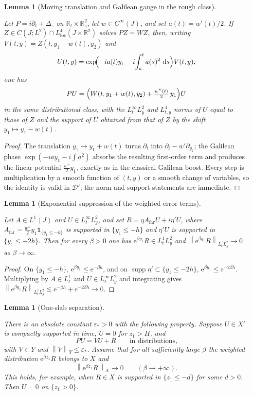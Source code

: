 \documentclass[11pt,oneside]{book}
\providecommand{\uses}[1]{}
\newtheorem{lemma}[theorem]{Lemma}
\theoremstyle{definition}
\theoremstyle{remark}
\newcommand{\R}{\mathbb R}
\newcommand{\D}{\mathcal D}
\newcommand{\supp}{\operatorname{supp}}
\newcommand{\1}{\mathbf 1}
\newcommand{\loc}{\mathrm{loc}}
\newcommand{\dd}{\,\mathrm d}
\newcommand{\norm}[1]{\left\lVert #1\right\rVert}
\newcommand{\e}{\mathrm e}
\newcommand{\eps}{\varepsilon}
\begin{document}
\begin{lemma}[Moving translation and Galilean gauge in the rough class]\label{lem:moving-galilean-distribution}
\uses{def:conjugated-operator}
Let $P=i\partial_t+\Delta_z$ on $\R_t\times\R^2_z$, let $w\in C^\infty(J)$, and set
$a(t)=w'(t)/2$. If $Z\in C(J;L^2)\cap L^4_{\loc}(J\times\R^2)$ solves $PZ=WZ$, then, writing
$V(t,y)=Z(t,y_1+w(t),y_2)$ and
\[
 U(t,y)=\exp\!\Bigl(-ia(t)y_1-i\!\int_a^t a(s)^2\,\dd s\Bigr)V(t,y),
\]
one has
\[
 PU=\Bigl(W(t,y_1+w(t),y_2)+\tfrac{w''(t)}2\,y_1\Bigr)U
\]
in the same distributional class, with the $L^\infty_tL^2_y$ and $L^4_{t,y}$ norms of $U$ equal
to those of $Z$ and the support of $U$ obtained from that of $Z$ by the shift $y_1\mapsto y_1-w(t)$.
\end{lemma}

\begin{proof}
\uses{}
The translation $y_1\mapsto y_1+w(t)$ turns $\partial_t$ into $\partial_t-w'\partial_{y_1}$; the
Galilean phase $\exp(-ia y_1-i\int a^2)$ absorbs the resulting first-order term and produces the
linear potential $\tfrac{w''}2 y_1$, exactly as in the classical Galilean boost. Every step is
multiplication by a smooth function of $(t,y)$ or a smooth change of variables, so the identity is
valid in $\D'$; the norm and support statements are immediate.
\end{proof}

\begin{lemma}[Exponential suppression of the weighted error terms]\label{lem:moment-error}
\uses{def:carleman-spaces}
Let $A\in L^1(J)$ and $U\in L^\infty_tL^2_y$, and set
$R=\eta A_{\mathrm{far}}U+i\eta'U$, where $A_{\mathrm{far}}=\tfrac{w''}2 y_1\1_{\{y_1\le-h\}}$ is
supported in $\{y_1\le-h\}$ and $\eta'U$ is supported in $\{y_1\le-2h\}$. Then for every
$\beta>0$ one has $\e^{\beta y_1}R\in L^1_tL^2_y$ and
$\norm{\e^{\beta y_1}R}_{L^1_tL^2_y}\to0$ as $\beta\to\infty$.
\end{lemma}

\begin{proof}
\uses{}
On $\{y_1\le-h\}$, $\e^{\beta y_1}\le\e^{-\beta h}$, and on $\supp\eta'\subset\{y_1\le-2h\}$,
$\e^{\beta y_1}\le\e^{-2\beta h}$. Multiplying by $A\in L^1_t$ and $U\in L^\infty_tL^2_y$ and
integrating gives $\norm{\e^{\beta y_1}R}_{L^1_tL^2_y}\lesssim\e^{-\beta h}+\e^{-2\beta h}\to0$.
\end{proof}

\begin{lemma}[One-slab separation]\label{lem:one-slab}
\uses{def:carleman-spaces}
There is an absolute constant $\eps_*>0$ with the following property. Suppose $U\in X'$ is compactly supported in time, $U=0$ for $z_1>H$, and
\[
 PU=VU+R
 \qquad\text{in distributions,}
\]
with $V\in Y$ and $\norm{V}_Y\le\eps_*$. Assume that for all sufficiently large $\beta$ the weighted distribution $\e^{\beta z_1}R$ belongs to $X$ and
\[
 \norm{\e^{\beta z_1}R}_X\longrightarrow0
 \qquad(\beta\to+\infty).
\]
This holds, for example, when $R\in X$ is supported in $\{z_1\le-d\}$ for some $d>0$. Then $U=0$ on $\{z_1>0\}$.
\end{lemma}
\end{document}
